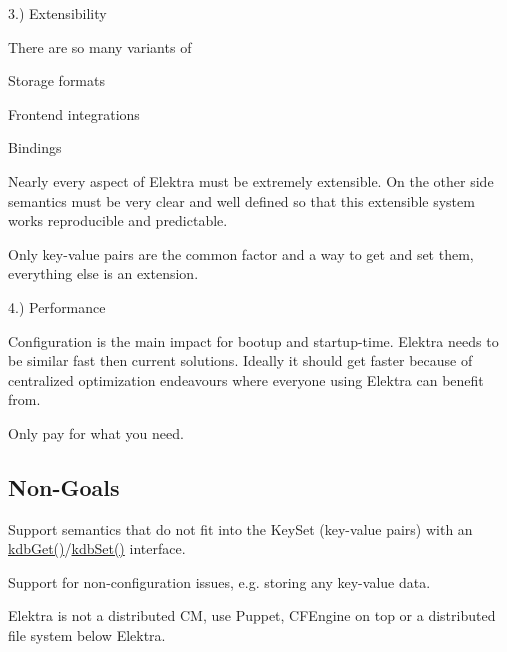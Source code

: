 3.) Extensibility

There are so many variants of


\begin{DoxyItemize}
\item Storage formats
\item Frontend integrations
\item Bindings
\end{DoxyItemize}

Nearly every aspect of Elektra must be extremely extensible. On the other side semantics must be very clear and well defined so that this extensible system works reproducible and predictable.

Only key-\/value pairs are the common factor and a way to get and set them, everything else is an extension.

4.) Performance

Configuration is the main impact for bootup and startup-\/time. Elektra needs to be similar fast then current solutions. Ideally it should get faster because of centralized optimization endeavours where everyone using Elektra can benefit from.

Only pay for what you need.

\subsection*{Non-\/\+Goals}


\begin{DoxyItemize}
\item Support semantics that do not fit into the Key\+Set (key-\/value pairs) with an {\ttfamily \hyperlink{group__kdb_ga28e385fd9cb7ccfe0b2f1ed2f62453a1}{kdb\+Get()}}/{\ttfamily \hyperlink{group__kdb_ga11436b058408f83d303ca5e996832bcf}{kdb\+Set()}} interface.
\item Support for non-\/configuration issues, e.\+g. storing any key-\/value data.
\item Elektra is not a distributed CM, use Puppet, C\+F\+Engine on top or a distributed file system below Elektra. 
\end{DoxyItemize}